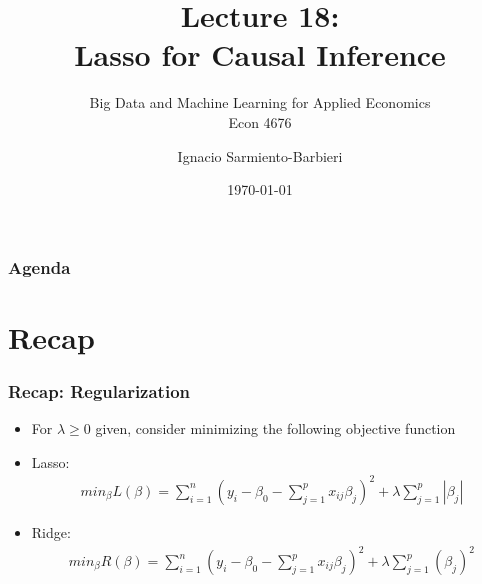 \documentclass[
  shownotes,
  xcolor={svgnames},
  hyperref={colorlinks,citecolor=DarkBlue,linkcolor=DarkRed,urlcolor=DarkBlue}
  , aspectratio=169]{beamer}
\begin{document}
 
\title[Lecture 18]{Lecture 18: \\ Lasso for Causal Inference}
\subtitle{Big Data and Machine Learning for Applied Economics \\ Econ 4676}
\date{\today}

\author[Sarmiento-Barbieri]{Ignacio Sarmiento-Barbieri}


\begin{frame}[noframenumbering]
\maketitle
\end{frame}





\begin{frame}
\frametitle{Agenda}

\tableofcontents

\end{frame}

\section{Recap }


\begin{frame}[fragile]
\frametitle{Recap: Regularization}


\begin{itemize}
\item For $\lambda \geq 0$ given, consider minimizing the following objective function
\item Lasso:
\begin{align}
min_{\beta} L(\beta) = \sum_{i=1}^n (y_i-\beta_0 - \sum_{j=1}^p x_{ij}\beta_j)^2 + \lambda \sum_{j=1}^p |\beta_j| 
\end{align}
\item Ridge:
\begin{align}
min_{\beta} R(\beta) = \sum_{i=1}^n (y_i-\beta_0 - \sum_{j=1}^p x_{ij}\beta_j)^2 + \lambda \sum_{j=1}^p (\beta_j)^2
\end{align}
\end{itemize}

\end{frame}
\end{document}
